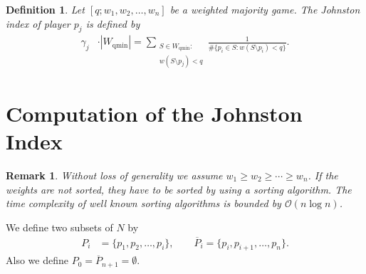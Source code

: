 \documentclass[review]{elsarticle}
\theoremstyle{defn}
\newtheorem{defn}[thm]{Definition}
\newtheorem{rem}[thm]{Remark}
\theoremstyle{Pseudo-Code}
\begin{document}
\begin{defn}
Let $[q;w_1,w_2,\dots,w_n]$ be a weighted majority game. The Johnston index of player $p_j$ is defined by
\begin{align}
  \label{eqn:Johnston}
  \gamma_j
  &\cdot 
  |W_\text{qmin}|
  =
  \sum_{\substack{S\in W_\text{qmin}:
    \\
     w(S\setminus p_j)<q}}
  \frac{1}{\#\{p_i\in S:w(S\setminus p_i)<q \}}
  .
\end{align}
\end{defn}

\section{Computation of the Johnston Index}

\begin{rem}
Without loss of generality we assume $w_1\geq w_2\geq \cdots \geq w_n$. If the weights are not sorted, they have to be sorted by using a sorting algorithm. The time complexity of well known sorting algorithms is bounded by $\mathcal{O}(n\log n)$.
\end{rem}


We define two subsets of $N$ by
\begin{align*}
  P_i
  &=
  \{p_1,p_2,\dots,p_i\},
\quad\quad
  \overline{P}_i
  =
  \{p_i,p_{i+1},\dots,p_n\}
  .
\end{align*}
Also we define $P_{0}=\overline{P}_{n+1}=\emptyset$.
\end{document}
